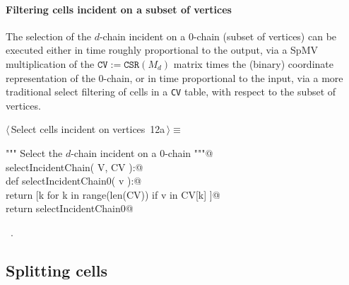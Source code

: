 \documentclass[11pt,oneside]{article}	%
\begin{document}
\paragraph{Filtering cells incident on a subset of vertices}

The selection of the $d$-chain incident on a $0$-chain (subset of vertices) can be executed either in time roughly proportional to the output, via a SpMV multiplication of the $\texttt{CV} := \texttt{CSR}(M_d)$ matrix times the (binary) coordinate representation of the $0$-chain, or in time proportional to the input, via a more traditional select filtering of cells in a \texttt{CV} table, with respect to the subset of vertices.


\begin{flushleft} \small \label{scrap21}
\protect{}$\langle\,$Select cells incident on vertices\nobreak\ {\footnotesize 12a}$\,\rangle\equiv$
\vspace{-1ex}
\begin{list}{}{} \item
\mbox{}\verb@""" Select the $d$-chain incident on a $0$-chain """@\\
\mbox{}\verb@def selectIncidentChain( V, CV ):@\\
\mbox{}\verb@   def selectIncidentChain0( v ):@\\
\mbox{}\verb@      return [k for k in range(len(CV)) if v in CV[k] ]@\\
\mbox{}\verb@   return selectIncidentChain0@\\
\mbox{}\verb@@{\NWsep}
\end{list}
\vspace{-1ex}
\footnotesize\addtolength{\baselineskip}{-1ex}
\begin{list}{}{\setlength{\itemsep}{-\parsep}\setlength{\itemindent}{-\leftmargin}}
\item \NWtxtMacroRefIn\ .
\end{list}
\end{flushleft}


\subsection{Splitting cells}
\end{document}
